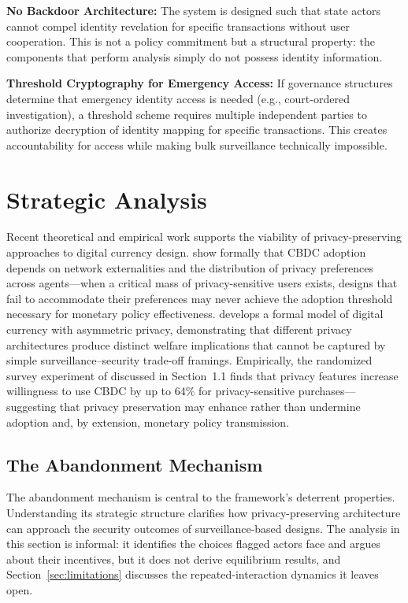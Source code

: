 \documentclass[11pt]{article}
\begin{document}
\textbf{No Backdoor Architecture:} The system is designed such that state actors cannot compel identity revelation for specific transactions without user cooperation. This is not a policy commitment but a structural property: the components that perform analysis simply do not possess identity information.

\textbf{Threshold Cryptography for Emergency Access:} If governance structures determine that emergency identity access is needed (e.g., court-ordered investigation), a threshold scheme requires multiple independent parties to authorize decryption of identity mapping for specific transactions. This creates accountability for access while making bulk surveillance technically impossible.


\section{Strategic Analysis}

Recent theoretical and empirical work supports the viability of privacy-preserving approaches to digital currency design. \citet{AgurAriDellAriccia2022} show formally that CBDC adoption depends on network externalities and the distribution of privacy preferences across agents---when a critical mass of privacy-sensitive users exists, designs that fail to accommodate their preferences may never achieve the adoption threshold necessary for monetary policy effectiveness. \citet{Tinn2025} develops a formal model of digital currency with asymmetric privacy, demonstrating that different privacy architectures produce distinct welfare implications that cannot be captured by simple surveillance--security trade-off framings. Empirically, the randomized survey experiment of \citet{choi2025cbdcprivacy} discussed in Section~1.1 finds that privacy features increase willingness to use CBDC by up to 64\% for privacy-sensitive purchases---suggesting that privacy preservation may enhance rather than undermine adoption and, by extension, monetary policy transmission.

\subsection{The Abandonment Mechanism}

The abandonment mechanism is central to the framework's deterrent properties. Understanding its strategic structure clarifies how privacy-preserving architecture can approach the security outcomes of surveillance-based designs. The analysis in this section is informal: it identifies the choices flagged actors face and argues about their incentives, but it does not derive equilibrium results, and Section~\ref{sec:limitations} discusses the repeated-interaction dynamics it leaves open.
\end{document}
